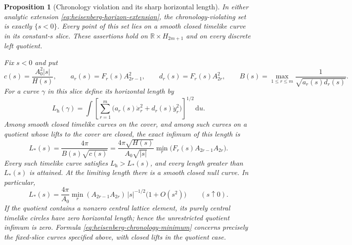 \documentclass[10pt,a4paper]{article}
\numberwithin{equation}{section}
\newtheorem{proposition}[theorem]{Proposition}
\theoremstyle{definition}
\theoremstyle{remark}
\newcommand{\dd}{\mathrm d}
\begin{document}
\begin{proposition}[Chronology violation and its sharp horizontal length]
\label{prop:heisenberg-cover-chronology}
In either analytic extension
\eqref{eq:heisenberg-horizon-extension}, the chronology-violating set
is exactly $\{s<0\}$.  Every point of this set lies on a smooth
closed timelike curve in its constant-$s$ slice.  These assertions
hold on $\mathbb R\times H_{2m+1}$ and on every discrete left quotient.

Fix $s<0$ and put
\begin{equation}
 c(s)=\frac{A_0^2|s|}{H(s)},\qquad
 a_r(s)=F_r(s)A_{2r-1}^2,\qquad
 d_r(s)=F_r(s)A_{2r}^2,\qquad
 B(s)=\max_{1\le r\le m}\frac1{\sqrt{a_r(s)d_r(s)}}.
 \label{eq:heisenberg-chronology-weights}
\end{equation}
For a curve $\gamma$ in this slice define its horizontal length by
\[
 L_{\mathrm h}(\gamma)=\int
 \left[\sum_{r=1}^m
       \bigl(a_r(s)\dot x_r^2+d_r(s)\dot y_r^2\bigr)\right]^{1/2}
 \,\dd u.
\]
Among smooth closed timelike curves on the cover, and among such
curves on a quotient whose lifts to the cover are closed, the exact
infimum of this length is
\begin{equation}
 L_*(s)=\frac{4\pi}{B(s)\sqrt{c(s)}}
 =\frac{4\pi\sqrt{H(s)}}{A_0\sqrt{|s|}}
       \min_r\bigl(F_r(s)A_{2r-1}A_{2r}\bigr).
 \label{eq:heisenberg-chronology-minimum}
\end{equation}
Every such timelike curve satisfies $L_{\mathrm h}>L_*(s)$, and
every length greater than $L_*(s)$ is attained.  At the limiting
length there is a smooth closed null curve.  In particular,
\begin{equation}
 L_*(s)=\frac{4\pi}{A_0}
       \min_r(A_{2r-1}A_{2r})\,|s|^{-1/2}
       \bigl(1+O(s^2)\bigr)
 \qquad(s\uparrow0).
 \label{eq:heisenberg-chronology-asymptotic}
\end{equation}
If the quotient contains a nonzero central lattice element, its purely
central timelike circles have zero horizontal length; hence the
unrestricted quotient infimum is zero.  Formula
\eqref{eq:heisenberg-chronology-minimum} concerns precisely the fixed-slice
curves specified above, with closed lifts in the quotient case.
\end{proposition}
\end{document}
